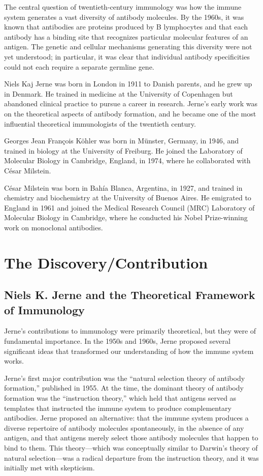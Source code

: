 The central question of twentieth-century immunology was how the immune system generates a vast diversity of antibody molecules. By the 1960s, it was known that antibodies are proteins produced by B lymphocytes and that each antibody has a binding site that recognizes particular molecular features of an antigen. The genetic and cellular mechanisms generating this diversity were not yet understood; in particular, it was clear that individual antibody specificities could not each require a separate germline gene.

Niels Kaj Jerne was born in London in 1911 to Danish parents, and he grew up in Denmark. He trained in medicine at the University of Copenhagen but abandoned clinical practice to pursue a career in research. Jerne's early work was on the theoretical aspects of antibody formation, and he became one of the most influential theoretical immunologists of the twentieth century.

Georges Jean Fran\c{c}ois K\"ohler was born in M\"unster, Germany, in 1946, and trained in biology at the University of Freiburg. He joined the Laboratory of Molecular Biology in Cambridge, England, in 1974, where he collaborated with C\'esar Milstein.

C\'esar Milstein was born in Bah\'ia Blanca, Argentina, in 1927, and trained in chemistry and biochemistry at the University of Buenos Aires. He emigrated to England in 1961 and joined the Medical Research Council (MRC) Laboratory of Molecular Biology in Cambridge, where he conducted his Nobel Prize-winning work on monoclonal antibodies.

\section{The Discovery/Contribution}

\subsection{Niels K. Jerne and the Theoretical Framework of Immunology}

Jerne's contributions to immunology were primarily theoretical, but they were of fundamental importance. In the 1950s and 1960s, Jerne proposed several significant ideas that transformed our understanding of how the immune system works.

Jerne's first major contribution was the ``natural selection theory of antibody formation,'' published in 1955. At the time, the dominant theory of antibody formation was the ``instruction theory,'' which held that antigens served as templates that instructed the immune system to produce complementary antibodies. Jerne proposed an alternative: that the immune system produces a diverse repertoire of antibody molecules spontaneously, in the absence of any antigen, and that antigens merely select those antibody molecules that happen to bind to them. This theory---which was conceptually similar to Darwin's theory of natural selection---was a radical departure from the instruction theory, and it was initially met with skepticism.

